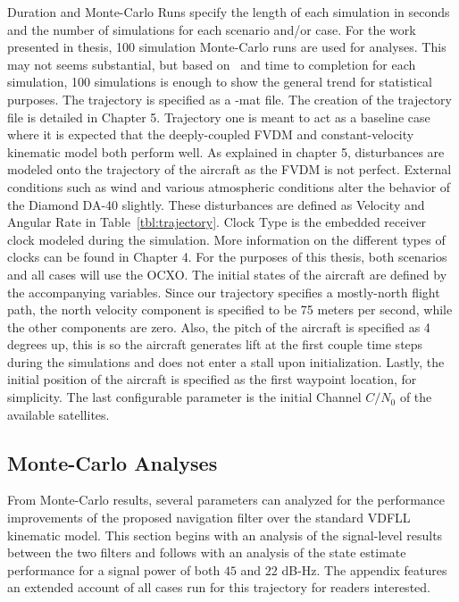Duration and Monte-Carlo Runs specify the length of each simulation in seconds and the number of simulations for each scenario and/or case. For the work presented in thesis, 100 simulation Monte-Carlo runs are used for analyses. This may not seems substantial, but based on~\cite{khaghaniAssessmentVDMbasedAutonomous2018,khaghaniAutonomousVehicleDynamic2016,mwenegohaModelbasedTightlyCoupled2020} and time to completion for each simulation, 100 simulations is enough to show the general trend for statistical purposes. The trajectory is specified as a -mat file. The creation of the trajectory file is detailed in Chapter 5. Trajectory one is meant to act as a baseline case where it is expected that the deeply-coupled FVDM and constant-velocity kinematic model both perform well.  As explained in chapter 5, disturbances are modeled onto the trajectory of the aircraft as the FVDM is not perfect. External conditions such as wind and various atmospheric conditions alter the behavior of the Diamond DA-40 slightly. These disturbances are defined as Velocity and Angular Rate in Table~\ref{tbl:trajectory}. Clock Type is the embedded receiver clock modeled during the simulation. More information on the different types of clocks can be found in Chapter 4. For the purposes of this thesis, both scenarios and all cases will use the OCXO\@. The initial states of the aircraft are defined by the accompanying variables. Since our trajectory specifies a mostly-north flight path, the north velocity component is specified to be 75 meters per second, while the other components are zero. Also, the pitch of the aircraft is specified as 4 degrees up, this is so the aircraft generates lift at the first couple time steps during the simulations and does not enter a stall upon initialization. Lastly, the initial position of the aircraft is specified as the first waypoint location, for simplicity. The last configurable parameter is the initial Channel \(C/N_0\) of the available satellites.


\subsection{\textbf{Monte-Carlo Analyses}}
From Monte-Carlo results, several parameters can analyzed for the performance improvements of the proposed navigation filter over the standard VDFLL kinematic model. This section begins with an analysis of the signal-level results between the two filters and follows with an analysis of the state estimate performance for a signal power of both \(45\) and \(22\) dB-Hz. The appendix features an extended account of all cases run for this trajectory for readers interested.

